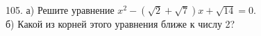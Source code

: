 105. а) Решите уравнение $x^2-(\sqrt{2}+\sqrt{7})x+\sqrt{14}=0.$\\
б) Какой из корней этого уравнения ближе к числу 2?\\
